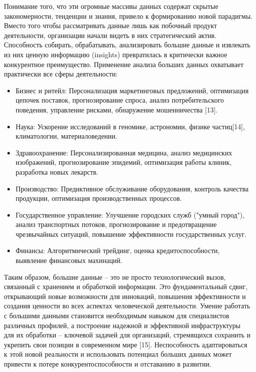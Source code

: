 Понимание того, что эти огромные массивы данных содержат скрытые закономерности, тенденции и знания, привело к формированию новой парадигмы. Вместо того чтобы рассматривать данные лишь как побочный продукт деятельности, организации начали видеть в них стратегический актив. Способность собирать, обрабатывать, анализировать большие данные и извлекать из них ценную информацию (insights) превратилась в критически важное конкурентное преимущество.
Применение анализа больших данных охватывает практически все сферы деятельности:
\begin{itemize}
	\item Бизнес и ритейл: Персонализация маркетинговых предложений, оптимизация цепочек поставок, прогнозирование спроса, анализ потребительского поведения, управление рисками, обнаружение мошенничества [13].
	\item Наука: Ускорение исследований в геномике, астрономии, физике частиц[14], климатологии, материаловедении.
	\item Здравоохранение: Персонализированная медицина, анализ медицинских изображений, прогнозирование эпидемий, оптимизация работы клиник, разработка новых лекарств.
	\item Производство: Предиктивное обслуживание оборудования, контроль качества продукции, оптимизация производственных процессов.
	\item Государственное управление: Улучшение городских служб ("умный город"), анализ транспортных потоков, прогнозирование и предотвращение чрезвычайных ситуаций, повышение эффективности государственных услуг.
	\item Финансы: Алгоритмический трейдинг, оценка кредитоспособности, выявление финансовых махинаций.
\end{itemize}
Таким образом, большие данные – это не просто технологический вызов, связанный с хранением и обработкой информации. Это фундаментальный сдвиг, открывающий новые возможности для инноваций, повышения эффективности и создания ценности во всех аспектах человеческой деятельности. Умение работать с большими данными становится необходимым навыком для специалистов различных профилей, а построение надежной и эффективной инфраструктуры для их обработки – ключевой задачей для организаций, стремящихся сохранить и укрепить свои позиции в современном мире [15]. Неспособность адаптироваться к этой новой реальности и использовать потенциал больших данных может привести к потере конкурентоспособности и отставанию в развитии.

